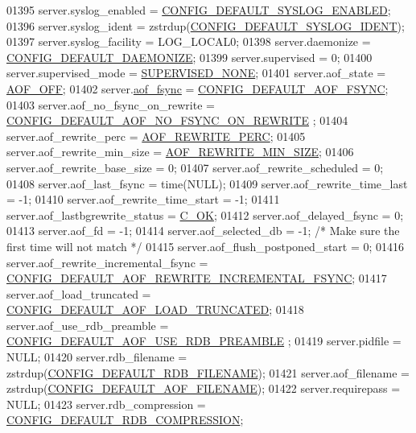 \begin{DoxyCode}
{{{{{{{{{{{{{{{01395     server.syslog\_enabled = \hyperlink{server_8h_a22c57e53d530d95ae346f13d6781a549}{CONFIG\_DEFAULT\_SYSLOG\_ENABLED};
01396     server.syslog\_ident = zstrdup(\hyperlink{server_8h_ac7414291a371fd3a2bad4d34e13f0d77}{CONFIG\_DEFAULT\_SYSLOG\_IDENT});
01397     server.syslog\_facility = LOG\_LOCAL0;
01398     server.daemonize = \hyperlink{server_8h_a1783425a4095949ab8b23ae4cbe0e576}{CONFIG\_DEFAULT\_DAEMONIZE};
01399     server.supervised = 0;
01400     server.supervised\_mode = \hyperlink{server_8h_a2a0d6ba64b419357e52a6473f48bc882}{SUPERVISED\_NONE};
01401     server.aof\_state = \hyperlink{server_8h_a5226306fbcebcb6d5d02e0fef3c213c2}{AOF\_OFF};
01402     server.\hyperlink{config_8h_af5994c643c434574580bb7816af82cad}{aof\_fsync} = \hyperlink{server_8h_af07bcc4b15ed4f7aed3f6efcb483b75b}{CONFIG\_DEFAULT\_AOF\_FSYNC};
01403     server.aof\_no\_fsync\_on\_rewrite = \hyperlink{server_8h_a9b588e3803fff7fe515f20d7bc4aa8e6}{CONFIG\_DEFAULT\_AOF\_NO\_FSYNC\_ON\_REWRITE}
      ;
01404     server.aof\_rewrite\_perc = \hyperlink{server_8h_a85f5870a07f58d1679988f7eb84ca995}{AOF\_REWRITE\_PERC};
01405     server.aof\_rewrite\_min\_size = \hyperlink{server_8h_a9b5a91047aa18eb5df52e99c97afab84}{AOF\_REWRITE\_MIN\_SIZE};
01406     server.aof\_rewrite\_base\_size = 0;
01407     server.aof\_rewrite\_scheduled = 0;
01408     server.aof\_last\_fsync = time(NULL);
01409     server.aof\_rewrite\_time\_last = -1;
01410     server.aof\_rewrite\_time\_start = -1;
01411     server.aof\_lastbgrewrite\_status = \hyperlink{server_8h_a303769ef1065076e68731584e758d3e1}{C\_OK};
01412     server.aof\_delayed\_fsync = 0;
01413     server.aof\_fd = -1;
01414     server.aof\_selected\_db = -1; \textcolor{comment}{/* Make sure the first time will not match */}
01415     server.aof\_flush\_postponed\_start = 0;
01416     server.aof\_rewrite\_incremental\_fsync = 
      \hyperlink{server_8h_a356d1b1e39a75671cc55fdaf64be3a85}{CONFIG\_DEFAULT\_AOF\_REWRITE\_INCREMENTAL\_FSYNC};
01417     server.aof\_load\_truncated = \hyperlink{server_8h_a35b94be7201c7ad80e43f8aa214867b7}{CONFIG\_DEFAULT\_AOF\_LOAD\_TRUNCATED};
01418     server.aof\_use\_rdb\_preamble = \hyperlink{server_8h_a938328826b94d0e9bd07b225767cad43}{CONFIG\_DEFAULT\_AOF\_USE\_RDB\_PREAMBLE}
      ;
01419     server.pidfile = NULL;
01420     server.rdb\_filename = zstrdup(\hyperlink{server_8h_af563e9454f9a1ef49de787e4fc66c448}{CONFIG\_DEFAULT\_RDB\_FILENAME});
01421     server.aof\_filename = zstrdup(\hyperlink{server_8h_af3bada72076c951a9d5959e73456635a}{CONFIG\_DEFAULT\_AOF\_FILENAME});
01422     server.requirepass = NULL;
01423     server.rdb\_compression = \hyperlink{server_8h_a250e4ab3a143ecbce2603ffaa3a29c0a}{CONFIG\_DEFAULT\_RDB\_COMPRESSION};
}}}}}}}}}}}}}}}
\end{DoxyCode}
